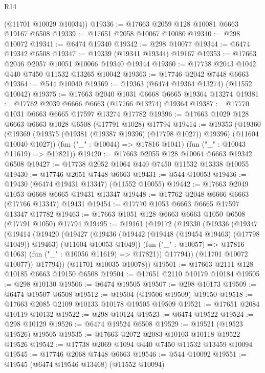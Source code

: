 \begin{lexlean}{R14}
\begin{coremodule}
      (@11701 @10029 @10034))
@19336 := @17663 @2059 @128 @10081 @6663 @19167 @6508
@19339 := @17651 @2058 @10067 @10080
@19340 := @298 @10072
@19341 := @6474 @19340
@19342 := @298 @10077
@19344 := @6474 @19342 @6508
@19347 := @19339 (@19341 @19344) @19167
@19353 := @17663 @2046 @2057 @10051 @10066 @19340 @19344
@19360 := @17738 @2043 @1042 @440 @7450 @11532 @13265 @10042
@19363 := @17746 @2042 @7448 @6663
@19364 := @544 @10040
@19369 := @19363 (@6474 @19364 @13274) (@11552 @10042)
@19375 := @17663 @2040 @1031 @6668 @6665 @19364 @13274
@19381 := @17762 @2039 @6666 @6663 (@17766 @13274) @19364
@19387 := @17770 @1031 @6663 @6665 @17597 @13274 @17782
@19396 := @17663 @1029 @128 @6663 @6663 @1028 @6508 (@17791 @1028) @17794
@19414 := @19353
    (@19360
      (@19369 (@19375 (@19381 (@19387 @19396) (@17798 @1027)) @19396) (@11604 @10040 @1027))
      (fun ("_" : @10044) => @17816 @1041)
      (fun ("_" : @10043 @11619) => @17821))
@19420 := @17663 @2055 @128 @10064 @6663 @19342 @6508
@19427 := @17738 @2052 @1064 @440 @7450 @11532 @13338 @10055
@19430 := @17746 @2051 @7448 @6663
@19431 := @544 @10053
@19436 := @19430 (@6474 @19431 @13347) (@11552 @10055)
@19442 := @17663 @2049 @1053 @6668 @6665 @19431 @13347
@19448 := @17762 @2048 @6666 @6663 (@17766 @13347) @19431
@19454 := @17770 @1053 @6663 @6665 @17597 @13347 @17782
@19463 := @17663 @1051 @128 @6663 @6663 @1050 @6508 (@17791 @1050) @17794
@19495 := @19161
    (@19172
      (@19330
        (@19336
          (@19347
            (@19414
              (@19420
                (@19427
                  (@19436
                    (@19442 (@19448 (@19454 @19463) (@17798 @1049)) @19463)
                    (@11604 @10053 @1049))
                  (fun ("_" : @10057) => @17816 @1063)
                  (fun ("_" : @10056 @11619) => @17821))
                @17794))
            (@11701 @10072 @10077))
          @17794))
      (@11701 @10035 @10078))
@19501 := @17663 @2111 @128 @10185 @6663 @19150 @6508
@19504 := @17651 @2110 @10179 @10184
@19505 := @298 @10130
@19506 := @6474 @19505
@19507 := @298 @10173
@19509 := @6474 @19507 @6508
@19512 := @19504 (@19506 @19509) @19150
@19518 := @17663 @2085 @2109 @10133 @10178 @19505 @19509
@19521 := @17651 @2084 @10119 @10132
@19522 := @298 @10124
@19523 := @6474 @19522
@19524 := @298 @10129
@19526 := @6474 @19524 @6508
@19529 := @19521 (@19523 @19526) @19505
@19535 := @17663 @2072 @2083 @10103 @10118 @19522 @19526
@19542 := @17738 @2069 @1094 @440 @7450 @11532 @13459 @10094
@19545 := @17746 @2068 @7448 @6663
@19546 := @544 @10092
@19551 := @19545 (@6474 @19546 @13468) (@11552 @10094)

\end{coremodule}
\end{lexlean}
